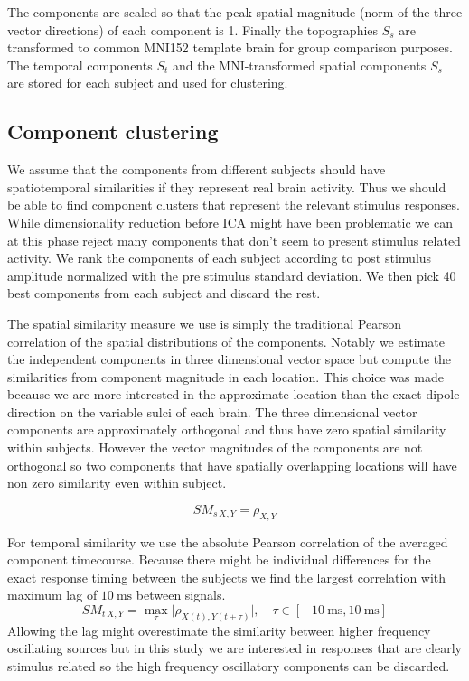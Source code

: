 \documentclass[]{article}
\begin{document}
The components are scaled so that the peak spatial magnitude (norm of the three vector directions) of each component is 1. Finally the topographies $S_s$ are transformed to common MNI152 template brain for group comparison purposes. The temporal components $S_t$ and the MNI-transformed spatial components $S_s$ are stored for each subject and used for clustering.


\subsection*{Component clustering}

We assume that the components from different subjects should have spatiotemporal similarities if they represent real brain activity. Thus we should be able to find component clusters that represent the relevant stimulus responses. While dimensionality reduction before ICA might have been problematic we can at this phase reject many components that don't seem to present stimulus related activity. We rank the components of each subject according to post stimulus amplitude normalized with the pre stimulus standard deviation. We then pick 40 best components from each subject and discard the rest.

The spatial similarity measure we use is simply the traditional Pearson correlation of the spatial distributions of the components. Notably we estimate the independent components in three dimensional vector space but compute the similarities from component magnitude in each location. This choice was made because we are more interested in the approximate location than the exact dipole direction on the variable sulci of each brain. The three dimensional vector components are approximately orthogonal and thus have zero spatial similarity within subjects. However the vector magnitudes of the components are not orthogonal so two components that have spatially overlapping locations will have non zero similarity even within subject.

\begin{equation}
	SM_{s \, X,Y} = \rho_{X, Y} 
\end{equation}

For temporal similarity we use the absolute Pearson correlation of the averaged component timecourse. Because there might be individual differences for the exact response timing between the subjects we find the largest correlation with maximum lag of $\SI{10}{\milli\second}$ between signals. 
\begin{equation}
SM_{t \, X,Y} = \max_\tau{\lvert\rho_{X(t), Y(t+\tau)}\rvert}, \quad \tau \in [\SI{-10}{\milli\second}, \SI{10}{\milli\second}]
\end{equation}
Allowing the lag might overestimate the similarity between higher frequency oscillating sources but in this study we are interested in responses that are clearly stimulus related so the high frequency oscillatory components can be discarded.
\end{document}
